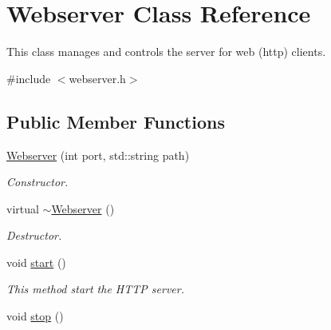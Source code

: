 \hypertarget{classWebserver}{\section{Webserver Class Reference}
\label{classWebserver}
}


This class manages and controls the server for web (http) clients.  




{\ttfamily \#include $<$webserver.\+h$>$}

\subsection*{Public Member Functions}
\begin{DoxyCompactItemize}
\item 
\hyperlink{classWebserver_aab4060192cea5906e454ade368a7790d}{Webserver} (int port, std\+::string path)
\begin{DoxyCompactList}\small\item\em Constructor. \end{DoxyCompactList}\item 
\hypertarget{classWebserver_ad2537de63b69487ea312f35adaa68c86}{virtual \hyperlink{classWebserver_ad2537de63b69487ea312f35adaa68c86}{$\sim$\+Webserver} ()}\label{classWebserver_ad2537de63b69487ea312f35adaa68c86}

\begin{DoxyCompactList}\small\item\em Destructor. \end{DoxyCompactList}\item 
\hypertarget{classWebserver_a8e45baa98078a53181a8032c9a0ac053}{void \hyperlink{classWebserver_a8e45baa98078a53181a8032c9a0ac053}{start} ()}\label{classWebserver_a8e45baa98078a53181a8032c9a0ac053}

\begin{DoxyCompactList}\small\item\em This method start the H\+T\+T\+P server. \end{DoxyCompactList}\item 
\hypertarget{classWebserver_a9d07a80d2228eb2e5b506710d16a16ec}{void \hyperlink{classWebserver_a9d07a80d2228eb2e5b506710d16a16ec}{stop} ()}\label{classWebserver_a9d07a80d2228eb2e5b506710d16a16ec}


\end{DoxyCompactItemize}

